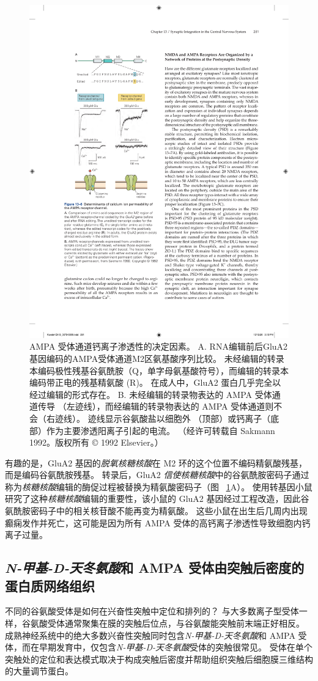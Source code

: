 \begin{figure}[htbp]
	\centering
	\includegraphics[width=0.45\linewidth]{chap13/fig_13_6}
	\caption{AMPA 受体通道钙离子渗透性的决定因素。 A. RNA编辑前后GluA2基因编码的AMPA受体通道M2区氨基酸序列比较。 未经编辑的转录本编码极性残基谷氨酰胺（Q，单字母氨基酸符号），而编辑的转录本编码带正电的残基精氨酸 (R)。 在成人中，GluA2 蛋白几乎完全以经过编辑的形式存在。 B. 未经编辑的转录物表达的 AMPA 受体通道传导 （左迹线），而经编辑的转录物表达的 AMPA 受体通道则不会（右迹线）。 迹线显示谷氨酸盐以细胞外 （顶部）或钙离子（底部）作为主要渗透阳离子引起的电流。 （经许可转载自 Sakmann 1992。版权所有 © 1992 Elsevier。）}
	\label{fig:13_6}
\end{figure}


有趣的是，GluA2 基因的\textit{脱氧核糖核酸}在 M2 环的这个位置不编码精氨酸残基，而是编码谷氨酰胺残基。
转录后，GluA2 \textit{信使核糖核酸}中的谷氨酰胺密码子通过称为\textit{核糖核酸}编辑的酶促过程被替换为精氨酸密码子（图 ~\ref{fig:13_6}A）。
使用转基因小鼠研究了这种\textit{核糖核酸}编辑的重要性，该小鼠的 GluA2 基因经过工程改造，因此谷氨酰胺密码子中的相关核苷酸不能再变为精氨酸。
这些小鼠在出生后几周内出现癫痫发作并死亡，这可能是因为所有 AMPA 受体的高钙离子渗透性导致细胞内钙离子过量。



\subsection{\textit{N-甲基-D-天冬氨酸}和 AMPA 受体由突触后密度的蛋白质网络组织}

不同的谷氨酸受体是如何在兴奋性突触中定位和排列的？ 
与大多数离子型受体一样，谷氨酸受体通常聚集在膜的突触后位点，与谷氨酸能突触前末端正好相反。
成熟神经系统中的绝大多数兴奋性突触同时包含\textit{N-甲基-D-天冬氨酸}和 AMPA 受体，而在早期发育中，仅包含\textit{N-甲基-D-天冬氨酸}受体的突触很常见。
受体在单个突触处的定位和表达模式取决于构成突触后密度并帮助组织突触后细胞膜三维结构的大量调节蛋白。


